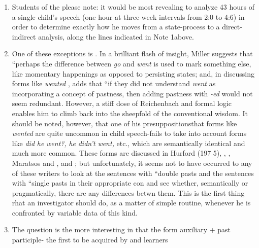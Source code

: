 \begin{enumerate}
\item Students of the   please note: it would be most revealing to analyze 43 hours of a single child's speech (one hour at three-week intervals from 2:0 to 4:6) in order to determine exactly how he moves from a state-process to a direct-indirect analysis, along the lines indicated in Note 1above.
\item One of these exceptions is \citet{Miller1978}. In a brilliant flash of insight, Miller suggests that ``perhaps the difference between \textit{go} and \textit{went} is used to mark something else, like momentary happen\-ings as opposed to persisting states{\textquotedbl}; and, in discussing forms like \textit{wented} , adds that ``if they did not understand \textit{went} as incorporating a concept of pastness, then adding pastness with \textit{{}-ed} would not seem redundant. However, a stiff dose of Reichenbach and formal logic enables him to climb back into the sheepfold of the conventional wisdom. It should be noted, however, that one of his presuppositions\-that forms like \textit{wented} are quite uncommon in child speech-fails to take into account forms like \textit{did} \textit{he} \textit{went?,} \textit{he} \textit{didn't} \textit{went,} etc., which are semantically identical and much more common. These forms are discussed in Hurford (197 5), \citet{Kuczaj1976}, \citet{Fay1978}, Maratsos and \citet{Kuczaj1978}, and \citet{ErreichEtAl1980}; but unfortunately, it seems not to have occurred to any of these writers to look at the sentences with ``double pasts and the sentences with ``single pasts in their appropriate con and see whether, semantically or pragmatically, there are any differences betwn them. This is the first thing rhat
an investigator should do, as a matter of simple routine, whenever he is confronted by variable data of this kind.
\item The question is the more interesting in that the form auxiliary
+ past participle- the first to be acquired by  and  learners

\end{enumerate}
